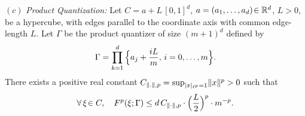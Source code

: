 \begin{prop}
%

$(c)$ {\em Product Quantization:}
Let $C=a+L\,[0,1]^d$, $a=(a_1,\ldots,a_d)\!\in \mathbb{R}^d$, $L>0$, be a hypercube,
with edges parallel to the coordinate axis with common edge-length $L$. Let $\Gamma$ be the product quantizer  of size $(m+1)^d$ defined by
$$
\Gamma=\displaystyle\prod_{k=1}^d\Big\{a_j+\frac{i L}{m},\, i=0,\ldots,m\Big \}.
$$
%
There exists a positive real  constant  $C_{\lVert.\rVert,p} = \sup_{|x|_{\ell^p}=1}\lVert x\rVert^p>0$ such that 
\begin{equation}\label{eq:prodFp}
  \forall \,\xi\!\in C,\quad F^p(\xi; \Gamma)  \leq  d\, C_{\norm{\cdot},p} \cdot
  \Bigl(\frac{L}{2} \Bigr)^p \cdot m^{-p}.
\end{equation}
\end{prop}

